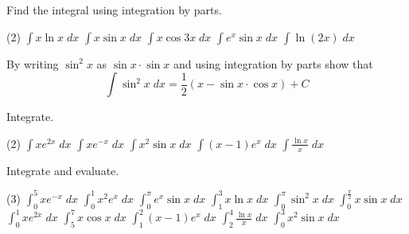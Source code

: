 \begin{Exercise}[title={Integration by Parts},label=exIBP]
	\Question Find the integral using integration by parts.
	\begin{tasks}(2)
		\task  $\int x \ln  x\; d x$ %
		\task $\int x \sin  x\; d x$ %
		\task $\int x \cos  3 x\; d x$ %
		\task $\int e^{x} \sin  x\; d x$ %
		\task $\int \ln  \left (2 x\right )\; d x$ %
	\end{tasks}
	
	\Question By writing $\sin ^{2} x$ as $\sin  x \cdot \sin  x$ and using integration by parts show that
	\begin{equation*}\int \sin ^{2} x\; d x =\frac{1}{2} \left (x -\sin  x \cdot \cos  x\right ) +C
	\end{equation*} %

	\Question Integrate.
	\begin{tasks}(2)
		\task  $\int x e^{2 x}\; d x$ %
		\task $\int x e^{ -x}\; d x$ %
		\task $\int x^{2} \sin  x\; d x$ %
		\task $\int \left (x -1\right ) e^{x}\; d x$ %
		\task $\int \frac{\ln  x}{x}\; d x$%
	\end{tasks}

	\Question Integrate and evaluate.
	\begin{tasks}(3)
		\task $\int _{0}^{5}x e^{ -x}\; d x$ 		%
		\task $\int _{0}^{1}x^{2} e^{x}\; d x$ %
		\task $\int _{0}^{\pi }e^{x} \sin  x\; d x$ %
		\task $\int _{1}^{3}x \ln  x\; d x$ %
		\task $\int _{0}^{\pi }\sin ^{2} x\; d x$%
		\task $\int _{0}^{\frac{\pi }{2}}x \sin  x\; d x$ %
		\task $\int _{0}^{1}x e^{2 x}\; d x$ %
		\task $\int _{5}^{7}x \cos  x\; d x$ %
		\task $\int _{1}^{2}\left (x -1\right ) e^{x}\; d x$ %
		\task $\int _{2}^{4}\frac{\ln  x}{x}\; d x$ %
		\task $\int _{0}^{3}x^{2} \sin  x\; d x$ %
	\end{tasks}
\end{Exercise}
